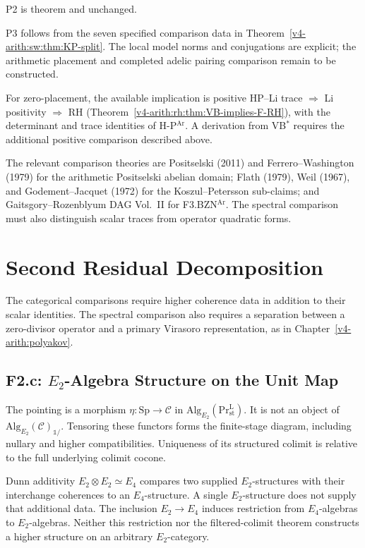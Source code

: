 P2 is theorem and unchanged.

P3 follows from the seven specified comparison data in
Theorem~\ref{v4-arith:sw:thm:KP-split}. The local model norms and
conjugations are explicit; the arithmetic placement and completed
adelic pairing comparison remain to be constructed.

For zero-placement, the available implication is positive HP--Li
trace \(\Rightarrow\) Li positivity \(\Rightarrow\) RH
(Theorem~\ref{v4-arith:rh:thm:VB-implies-F-RH}), with the determinant and trace
identities of H-P\(^{\mathrm{Ar}}\). A derivation from VB\(^{*}\)
requires the additional positive comparison described above.

The relevant comparison theories are Positselski (2011) and
Ferrero--Washington (1979) for the arithmetic Positselski abelian
domain; Flath (1979), Weil (1967), and Godement--Jacquet (1972) for
the Koszul--Petersson sub-claims; and Gaitsgory--Rozenblyum DAG
Vol.~II for F3.BZN\(^{\mathrm{Ar}}\). The spectral comparison must
also distinguish scalar traces from operator quadratic forms.

\section{Second Residual Decomposition}
\label{v4-arith:sw:wave2}

The categorical comparisons require higher coherence data in addition
to their scalar identities. The spectral comparison also requires a
separation between a zero-divisor operator and a primary Virasoro
representation, as in Chapter~\ref{v4-arith:polyakov}.

\subsection{F2.c: \texorpdfstring{\(E_{2}\)}{E2}-Algebra Structure on the Unit Map}

The pointing is a morphism \(\eta:\mathrm{Sp}\to\mathcal C\)
in \(\mathrm{Alg}_{E_2}(\mathrm{Pr}^{\mathrm L}_{\mathrm{st}})\).
It is not an object of
\(\mathrm{Alg}_{E_2}(\mathcal C)_{\mathbb1/}\).
Tensoring these functors forms the finite-stage diagram,
including nullary and higher compatibilities.
Uniqueness of its structured colimit is relative to the full
underlying colimit cocone.

Dunn additivity \(E_2\otimes E_2\simeq E_4\) compares two
supplied \(E_2\)-structures with their interchange coherences
to an \(E_4\)-structure. A single \(E_2\)-structure does not
supply that additional data. The inclusion \(E_2\to E_4\)
induces restriction from \(E_4\)-algebras to \(E_2\)-algebras.
Neither this restriction nor the filtered-colimit theorem
constructs a higher structure on an arbitrary \(E_2\)-category.

